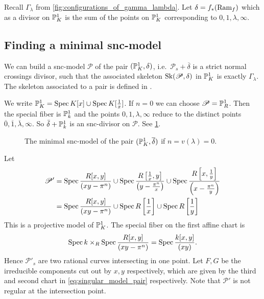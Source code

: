 Recall $\Gamma_\lambda$ from \cref{fig:configurations_of_gamma_lambda}. 
Let $\delta = f_* (\operatorname{Ram}_f)$ which as a divisor on $\mathbb{P}^{1}_K$ is the sum of the points on $\mathbb{P}^{1}_K$ corresponding to $0, 1, \lambda, \infty$. 
\subsection{Finding a minimal snc-model} \label{sec:finding_a_minimal_snc_model}
We can build a snc-model $\mathscr P$ of the pair $(\mathbb{P}^{1}_K, \delta)$, i.e.\ $\mathscr P_s + \overline{\delta}$ is a strict normal crossings divisor, such that the associated skeleton $\operatorname{Sk}(\mathscr P, \delta)$ in $\mathbb{P}^{1}_K$ is exactly $\Gamma_\lambda$. 
The skeleton associated to a pair is defined in \cite[§3.2.1]{bakerWeightFunctionsBerkovich2016}.

We write $\mathbb{P}^{1}_K = \operatorname{Spec} K[x] \cup \operatorname{Spec} K[\frac{1}{x}]$.
If $n = 0$ we can choose $\mathscr P = \mathbb{P}^{1}_R$. Then the special fiber is $\mathbb{P}^{1}_k$ and the points $0, 1, \lambda, \infty$ reduce to the distinct points $\overline{0}, \overline{1}, \overline{\lambda}, \overline{\infty}$.
So $\bar{\delta} + \mathbb{P}^{1}_k$ is an snc-divisor on $\mathscr P$. 
See \cref{fig:model_pair_n_1}. 
\begin{figure}[h]
    \centering
    \caption{The minimal snc-model of the pair $(\mathbb{P}^{1}_K, \overline{\delta})$ if $n =v(\lambda) = 0$.}
    \label{fig:model_pair_n_1}
\end{figure}

Let 
\begin{align}\label{eq:singular_model_pair}
	\mathscr P' &= \operatorname{Spec} \frac{R[x, y]}{(xy - \pi^{n})} \cup \operatorname{Spec} \frac{R\left[ \frac{1}{x},y \right]}{\left(y-\frac{\pi^{n}}{x}\right)} \cup \operatorname{Spec} \frac{R\left[x, \frac{1}{y}\right]}{\left(x - \frac{\pi^{n}}{y}\right)} \\
	&=  \operatorname{Spec} \frac{R[x, y]}{(xy - \pi^{n})} \cup \operatorname{Spec} R\left[ \frac{1}{x} \right] \cup \operatorname{Spec} R\left[ \frac{1}{y}\right] \nonumber 
 \end{align} 
This is a projective model of $\mathbb{P}^{1}_K$. 
The special fiber on the first affine chart is \[
	\operatorname{Spec} k \times _{R} \operatorname{Spec} \frac{R[x, y]}{(xy -\pi^{n})}=\operatorname{Spec}  \frac{k[x, y]}{(xy)}
.\] 
Hence $\mathscr P'_s$ are two rational curves intersecting in one point. 
Let $F, G$ be the irreducible components cut out by $x, y$ respectively, which are given by the third and second chart in \eqref{eq:singular_model_pair} respectively. 
Note that $\mathscr P'$ is not regular at the intersection point.

